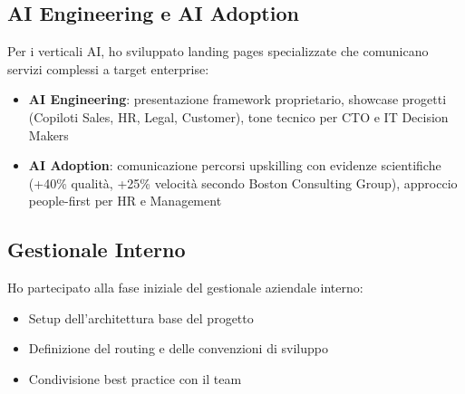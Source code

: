 \subsection{AI Engineering e AI Adoption}
Per i verticali AI, ho sviluppato landing pages specializzate che comunicano servizi complessi a target enterprise:
\begin{itemize}
  \item \textbf{AI Engineering}: presentazione framework proprietario, showcase progetti (Copiloti Sales, HR, Legal, Customer), tone tecnico per CTO e IT Decision Makers
  \item \textbf{AI Adoption}: comunicazione percorsi upskilling con evidenze scientifiche (+40\% qualità, +25\% velocità secondo Boston Consulting Group), approccio people-first per HR e Management
\end{itemize}

\subsection{Gestionale Interno}
Ho partecipato alla fase iniziale del gestionale aziendale interno:
\begin{itemize}
  \item Setup dell'architettura base del progetto
  \item Definizione del routing e delle convenzioni di sviluppo
  \item Condivisione best practice con il team
\end{itemize}
